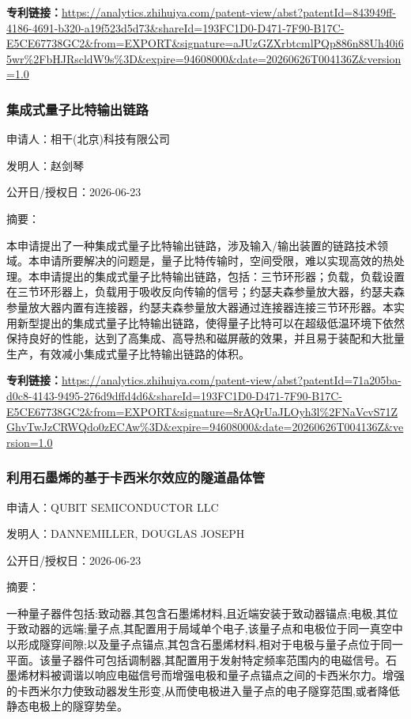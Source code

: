 \documentclass[12pt,a4paper]{ctexart}
\begin{document}
\noindent\textbf{专利链接：}\url{https://analytics.zhihuiya.com/patent-view/abst?patentId=843949ff-4186-4691-b320-a19f523d5d73&shareId=193FC1D0-D471-7F90-B17C-E5CE67738GC2&from=EXPORT&signature=aJUzGZXrbtcmlPQp886n88Uh40i65wr%2FbHJRscldW9s%3D&expire=94608000&date=20260626T004136Z&version=1.0}

\subsubsection{ 集成式量子比特输出链路 }

申请人：相干(北京)科技有限公司

发明人：赵剑琴

公开日/授权日：2026-06-23

摘要：

本申请提出了一种集成式量子比特输出链路，涉及输入/输出装置的链路技术领域。本申请所要解决的问题是，量子比特传输时，空间受限，难以实现高效的热处理。本申请提出的集成式量子比特输出链路，包括：三节环形器；负载，负载设置在三节环形器上，负载用于吸收反向传输的信号；约瑟夫森参量放大器，约瑟夫森参量放大器内置有连接器，约瑟夫森参量放大器通过连接器连接三节环形器。本实用新型提出的集成式量子比特输出链路，使得量子比特可以在超级低温环境下依然保持良好的性能，达到了高集成、高导热和磁屏蔽的效果，并且易于装配和大批量生产，有效减小集成式量子比特输出链路的体积。

\noindent\textbf{专利链接：}\url{https://analytics.zhihuiya.com/patent-view/abst?patentId=71a205ba-d0c8-4143-9495-276d9dffd4d6&shareId=193FC1D0-D471-7F90-B17C-E5CE67738GC2&from=EXPORT&signature=8rAQrUaJLOyh3l%2FNaVcvS71ZGhvTwJzCRWQdo0zECAw%3D&expire=94608000&date=20260626T004136Z&version=1.0}

\subsubsection{ 利用石墨烯的基于卡西米尔效应的隧道晶体管 }

申请人：QUBIT SEMICONDUCTOR LLC

发明人：DANNEMILLER, DOUGLAS JOSEPH

公开日/授权日：2026-06-23

摘要：

一种量子器件包括:致动器,其包含石墨烯材料,且近端安装于致动器锚点;电极,其位于致动器的远端;量子点,其配置用于局域单个电子,该量子点和电极位于同一真空中以形成隧穿间隙;以及量子点锚点,其包含石墨烯材料,相对于电极与量子点位于同一平面。该量子器件可包括调制器,其配置用于发射特定频率范围内的电磁信号。石墨烯材料被调谐以响应电磁信号而增强电极和量子点锚点之间的卡西米尔力。增强的卡西米尔力使致动器发生形变,从而使电极进入量子点的电子隧穿范围,或者降低静态电极上的隧穿势垒。
\end{document}
